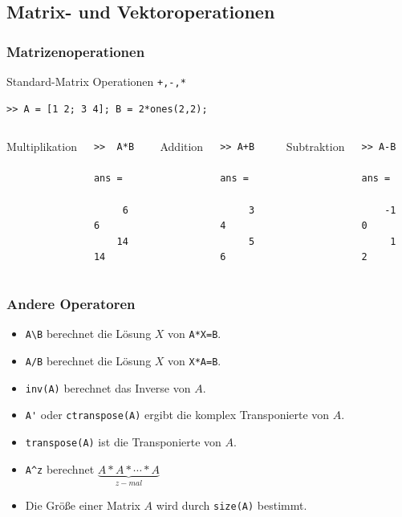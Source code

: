 \subsection{Matrix- und Vektoroperationen}
%
%
\begin{frame}[fragile]\frametitle{Matrizenoperationen}

Standard-Matrix Operationen \lstinline!+,-,*!
\begin{lstlisting}
>> A = [1 2; 3 4]; B = 2*ones(2,2);
\end{lstlisting}
\begin{columns}[t]%
%
Multiplikation
\begin{lstlisting}
>>  A*B

ans =

     6     6
    14    14
\end{lstlisting}
%
Addition
\begin{lstlisting}
>> A+B

ans =

     3     4
     5     6
\end{lstlisting}
%
Subtraktion
\begin{lstlisting}
>> A-B

ans =

    -1     0
     1     2
\end{lstlisting}
\end{columns}
\end{frame}
%
%
\begin{frame}[fragile]\frametitle{Andere Operatoren}
\begin{itemize}
\item \lstinline!A\B! berechnet die Lösung $X$ von \lstinline!A*X=B!. \\

\item \lstinline!A/B! berechnet die Lösung $X$ von \lstinline!X*A=B!.\\

\item \lstinline!inv(A)! berechnet das Inverse von $A$.\\

\item \lstinline!A'! oder \lstinline!ctranspose(A)! ergibt die
  komplex Transponierte von $A$. \\

\item \lstinline!transpose(A)! ist die Transponierte von $A$. \\

\item \lstinline!A^z! berechnet $\underbrace{A*A*\cdots *A}_{z-mal}$\\

\item Die Gr\"o{\ss}e einer Matrix $A$ wird durch \lstinline!size(A)!
  bestimmt. 
\end{itemize}
\end{frame}
